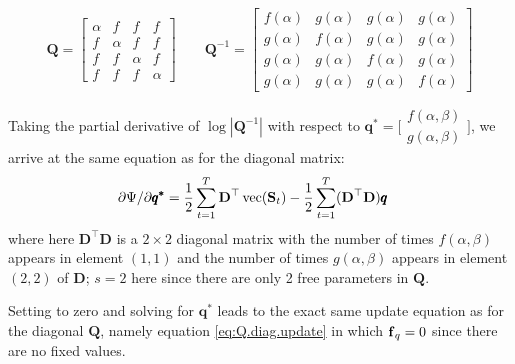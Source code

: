 \documentclass[]{article}
\def\DD{\mbox{$\mathbf D$}}	\def\dd{\mbox{$\mathbf d$}}
\def\QQ{\mbox{$\mathbf Q$}}	 \def\qq{\mbox{$\mathbf q$}}
\def\SS{\mbox{$\mathbf S$}}
\def\vec{\,\textup{\textrm{vec}}}
\begin{document}
\begin{equation*}
\QQ=
\begin{bmatrix}
\alpha&f&f&f\\
f&\alpha&f&f\\
f&f&\alpha&f\\
f&f&f&\alpha
\end{bmatrix}\quad\quad
\QQ^{-1}=
\begin{bmatrix}
f(\alpha)&g(\alpha)&g(\alpha)&g(\alpha)\\
g(\alpha)&f(\alpha)&g(\alpha)&g(\alpha)\\
g(\alpha)&g(\alpha)&f(\alpha)&g(\alpha)\\
g(\alpha)&g(\alpha)&g(\alpha)&f(\alpha)
\end{bmatrix}
\end{equation*}

Taking the partial derivative of $\log |\QQ^{-1}|$ with respect to $\pmb{q^{*}}=\big[\begin{smallmatrix}f(\alpha,\beta)\\g(\alpha,\beta)\end{smallmatrix}\big]$, we arrive at the same equation as for the diagonal matrix:
\begin{equation}\label{eq:Q.eqvarcov2}
\begin{split}
&\partial\Psi/\partial\pmb{q^{*}} = 
\frac{1}{2} \sum_{t=1}^T\DD^\top \vec(\SS_t) - \frac{1}{2}\sum_{t=1}^T(\DD^\top\DD)\pmb{q}
\end{split}
\end{equation}
where here $\DD^\top\DD$ is a $2 \times 2$ diagonal matrix with the number of times $f(\alpha,\beta)$ appears in element $(1,1)$ and the number of times $g(\alpha,\beta)$ appears in element $(2,2)$ of $\DD$; $s=2$ here since there are only 2 free parameters in $\QQ$.

Setting to zero and solving for $\pmb{q^{*}}$ leads to the exact same update equation as for the diagonal $\QQ$, namely equation \ref{eq:Q.diag.update} in which $\mbox{$\mathbf f$}_q = 0$ since there are no fixed values.
\end{document}
